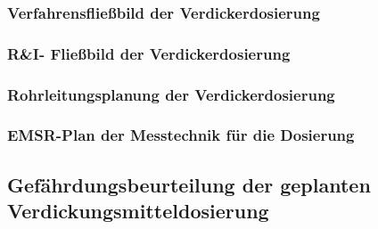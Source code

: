 \subsubsection{Verfahrensfließbild der Verdickerdosierung}
\subsubsection{R\&I- Fließbild der Verdickerdosierung}
\subsubsection{Rohrleitungsplanung der Verdickerdosierung}

\subsubsection{EMSR-Plan der Messtechnik für die Dosierung}

\subsection{Gefährdungsbeurteilung der geplanten Verdickungsmitteldosierung}


